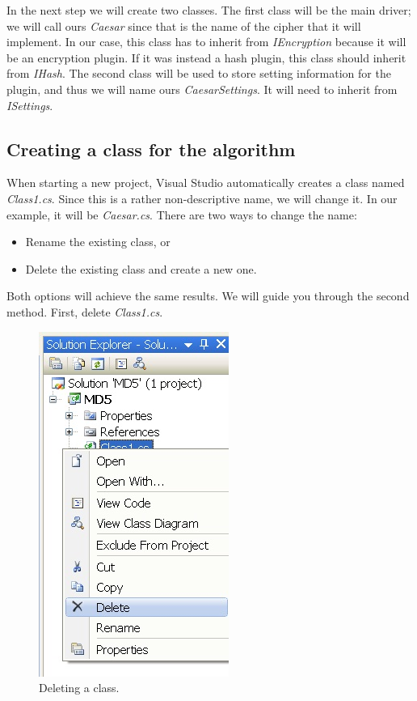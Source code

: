 In the next step we will create two classes. The first class will be the main driver; we will call ours \textit{Caesar} since that is the name of the cipher that it will implement. In our case, this class has to inherit from \textit{IEncryption} because it will be an encryption plugin. If it was instead a hash plugin, this class should inherit from \textit{IHash}. The second class will be used to store setting information for the plugin, and thus we will name ours \textit{CaesarSettings}. It will need to inherit from \textit{ISettings}.
\clearpage

\subsection{Creating a class for the algorithm}
\label{sec:CreatingAClassForTheAlgorithm}

When starting a new project, Visual Studio automatically creates a class named \textit{Class1.cs}. Since this is a rather non-descriptive name, we will change it. In our example, it will be \textit{Caesar.cs}. There are two ways to change the name:

\begin{itemize}
	\item Rename the existing class, or
	\item Delete the existing class and create a new one.
\end{itemize}

\noindent Both options will achieve the same results. We will guide you through the second method. First, delete \textit{Class1.cs}.

\begin{figure}[h!]
	\centering
		\includegraphics{figures/new_class.jpg}
	\caption{Deleting a class.}
	\label{fig:new_class}
\end{figure}
\clearpage

